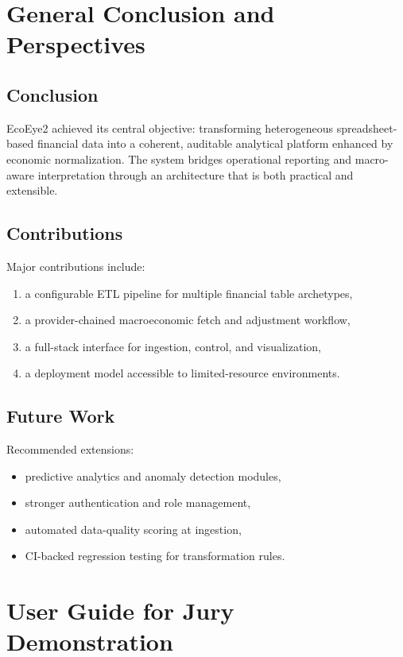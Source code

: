 \documentclass[12pt,a4paper]{report}
\begin{document}
\chapter{General Conclusion and Perspectives}
\section{Conclusion}
EcoEye2 achieved its central objective: transforming heterogeneous spreadsheet-based financial data into a coherent, auditable analytical platform enhanced by economic normalization. The system bridges operational reporting and macro-aware interpretation through an architecture that is both practical and extensible.

\section{Contributions}
Major contributions include:
\begin{enumerate}[leftmargin=1.5em]
  \item a configurable ETL pipeline for multiple financial table archetypes,
  \item a provider-chained macroeconomic fetch and adjustment workflow,
  \item a full-stack interface for ingestion, control, and visualization,
  \item a deployment model accessible to limited-resource environments.
\end{enumerate}

\section{Future Work}
Recommended extensions:
\begin{itemize}[leftmargin=1.5em]
  \item predictive analytics and anomaly detection modules,
  \item stronger authentication and role management,
  \item automated data-quality scoring at ingestion,
  \item CI-backed regression testing for transformation rules.
\end{itemize}

\appendix
\chapter{User Guide for Jury Demonstration}
\end{document}
